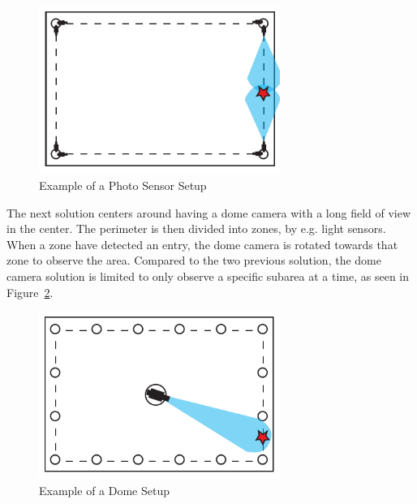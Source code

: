 \begin{figure}[htb]
    \centering
    \includegraphics[width=0.7\textwidth]{gfx/light_sensor.pdf}
    \caption{Example of a Photo Sensor Setup}
    \label{fig:photo_sensor}
\end{figure}

The next solution centers around having a dome camera with a long field of view in the center.
The perimeter is then divided into zones, by e.g. light sensors.
When a zone have detected an entry, the dome camera is rotated towards that zone to observe the area.
Compared to the two previous solution, the dome camera solution is limited to only observe a specific subarea at a time, as seen in Figure~\ref{fig:drone_sensor}. \\

\begin{figure}[htb]
    \centering
    \includegraphics[width=0.7\textwidth]{gfx/drome_sensor.pdf}
    \caption{Example of a Dome Setup}
    \label{fig:drone_sensor}
\end{figure}
